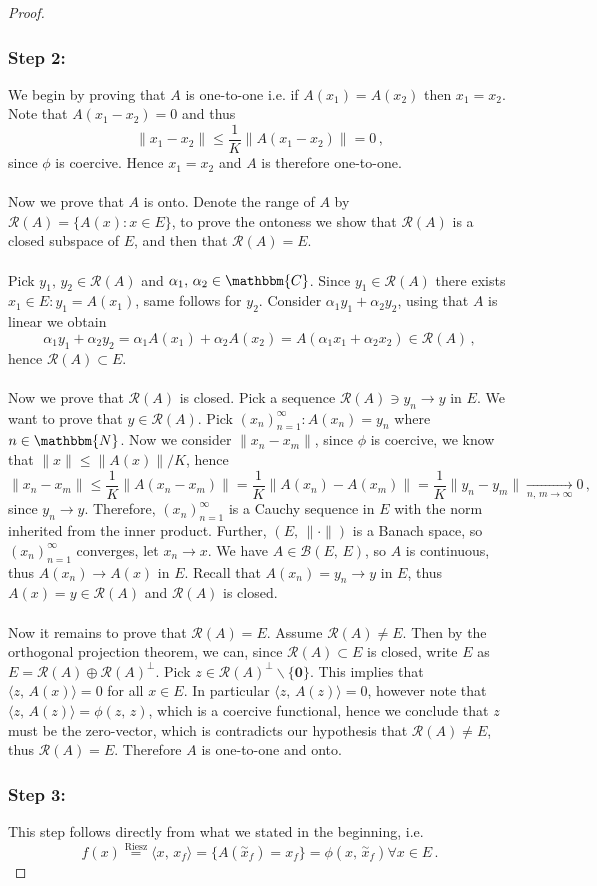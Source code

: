 \documentclass[12pt, a4paper]{article}
\newcommand{\N}{\ensuremath{\mathbbm{N}}}
\newcommand{\C}{\ensuremath{\mathbbm{C}}}
\begin{document}
\begin{proof}
\subsubsection*{Step 2:}
We begin by proving that $A$ is one-to-one i.e. if $A(x_1)=A(x_2)$ then $x_1=x_2$. Note that $A(x_1-x_2)=0$ and thus
\[
    \|x_1-x_2\|\leq \dfrac{1}{K}\|A(x_1-x_2)\|=0\,,
\]
since $\phi$ is coercive. Hence $x_1=x_2$ and $A$ is therefore one-to-one.
\\\\
Now we prove that $A$ is onto. Denote the range of $A$ by $\mathcal{R}(A)=\{A(x):x\in E\}$, to prove the ontoness we show that $\mathcal{R}(A)$ is a closed subspace of $E$, and then that $\mathcal{R}(A)=E$.
\\\\
Pick $y_1,\,y_2\in \mathcal{R}(A)$ and $\alpha_1,\,\alpha_2\in\C$. Since $y_1\in \mathcal{R}(A)$ there exists $x_1\in E:y_1=A(x_1)$, same follows for $y_2$. Consider $\alpha_1y_1+\alpha_2y_2$, using that $A$ is linear we obtain
\[
    \alpha_1y_1+\alpha_2y_2=\alpha_1A(x_1)+\alpha_2A(x_2)=A(\alpha_1x_1+\alpha_2x_2)\in\mathcal{R}(A)\,,
\]
hence $\mathcal{R}(A)\subset E$.
\\\\
Now we prove that $\mathcal{R}(A)$ is closed. Pick a sequence $\mathcal{R}(A)\ni y_n\to y$ in $E$. We want to prove that $y\in\mathcal{R}(A)$. Pick $(x_n)_{n=1}^\infty:A(x_n)=y_n$ where $n\in\N$. Now we consider $\|x_n-x_m\|$, since $\phi$ is coercive, we know that $\|x\|\leq \|A(x)\|/K$, hence
\[
    \|x_n-x_m\|\leq \dfrac{1}{K}\|A(x_n-x_m)\|=\dfrac{1}{K}\|A(x_n)-A(x_m)\|=\dfrac{1}{K}\|y_n-y_m\|\underset{n,\,m\to\infty}{\longrightarrow}0\,,
\]
since $y_n\to y$. Therefore, $(x_n)_{n=1}^\infty$ is a Cauchy sequence in $E$ with the norm inherited from the inner product. Further, $(E,\,\|\cdot\|)$ is a Banach space, so $(x_n)_{n=1}^\infty$ converges, let $x_n\to x$. We have $A\in\mathcal{B}(E,\,E)$, so $A$ is continuous, thus $A(x_n)\to A(x)$ in $E$. \newline\noindent Recall that $A(x_n)=y_n\to y$ in $E$, thus $A(x)=y\in\mathcal{R}(A)$ and $\mathcal{R}(A)$ is closed.
\\\\
Now it remains to prove that $\mathcal{R}(A)=E$. Assume $\mathcal{R}(A)\neq E$. Then by the orthogonal projection theorem, we can, since $\mathcal{R}(A)\subset E$ is closed, write $E$ as $E=\mathcal{R}(A)\oplus\mathcal{R}(A)^\perp$. Pick $z\in\mathcal{R}(A)^\perp\backslash\{\mathbf{0}\}$. This implies that $\langle z,\,A(x)\rangle=0$ for all $x\in E$. In particular $\langle z,\,A(z)\rangle=0$, however note that $\langle z,\,A(z)\rangle=\phi(z,\,z)$, which is a coercive functional, hence we conclude that $z$ must be the zero-vector, which is contradicts our hypothesis that $\mathcal{R}(A)\neq E$, thus $\mathcal{R}(A)=E$. Therefore $A$ is one-to-one and onto.
\subsubsection*{Step 3:}
This step follows directly from what we stated in the beginning, i.e.
\[
    f(x)\overset{\text{Riesz}}{=}\langle x,\,x_f\rangle=\{A(\overset{\sim}{x}_f)=x_f\}=\phi(x,\,\overset{\sim}{x}_f)\forall x\in E\,.
\]
\end{proof}
\end{document}
